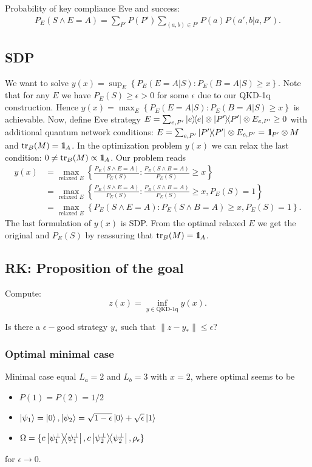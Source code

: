 \documentclass[12pt,a4paper,reqno, aps, superscriptaddress]{amsart}
\newcommand{\Id}{{\rm 1\hspace{-0.9mm}l}}
\newcommand{\proj}[1]{\ensuremath{\ketbra{#1}{#1}}}
\begin{document}
Probability of key compliance Eve and success:
\begin{equation}
\begin{split}
    P_E(S \wedge E=A) =\sum_{P'} P(P') \sum_{(a,b) \in P'} P(a) P(a',b|a,P').
\end{split}
\end{equation}

\subsection{SDP}
We want to solve $y(x) = \sup_E\left\{ P_E(E=A|S): P_E(B=A|S) \ge x\right\}$. Note that for any $E$ we have $P_E(S) \ge \epsilon > 0$ for some $\epsilon$ due to our QKD-1q construction. Hence $y(x) = \max_E\left\{ P_E(E=A|S): P_E(B=A|S) \ge x\right\}$ is achievable. Now, define Eve strategy $E = \sum_{e,P'} \proj{e} \otimes \proj{P'} \otimes E_{e,P'} \ge 0$ with additional quantum network conditions: $E = \sum_{e,P'} \proj{P'} \otimes E_{e,P'} = \Id_{P'} \otimes M$ and $\tr_{B}(M) = \Id_A$. In the optimization problem $y(x)$ we can relax the last condition: $0 \neq \tr_{B}(M) \propto \Id_A$. Our problem reads
\begin{equation}
    \begin{split}
        y(x) &= \max_{\text{relaxed }E}\left\{ \frac{P_E(S \wedge E=A)}{P_E(S)}: \frac{P_E(S \wedge B=A)}{P_E(S)} \ge x\right\}\\
        &= \max_{\text{relaxed }E}\left\{ \frac{P_E(S \wedge E=A)}{P_E(S)}: \frac{P_E(S \wedge B=A)}{P_E(S)} \ge x, P_E(S)=1\right\}\\
        &= \max_{\text{relaxed }E}\left\{ P_E(S \wedge E=A): P_E(S \wedge B=A) \ge x, P_E(S)=1\right\}.
    \end{split}
\end{equation}
The last formulation of $y(x)$ is SDP. From the optimal relaxed $E$ we get the original and $P_E(S)$ by reassuring that $\tr_{B}(M) = \Id_A$.  

\subsection{RK: Proposition of the goal}
Compute:
\begin{equation}
    z(x) = \inf_{y \in \text{QKD-1q}} y(x).
\end{equation}

Is there a $\epsilon-$good strategy $y_*$ such that $\|z-y_*\|\le \epsilon$?

\subsubsection{Optimal minimal case}
Minimal case equal $L_a=2$ and $L_b=3$ with $x=2$, where optimal seems to be
\begin{itemize}
    \item $P(1)=P(2)=1/2$
    \item $\ket{\psi_1}=\ket{0}, \ket{\psi_2}=\sqrt{1-\epsilon}\ket{0}+\sqrt{\epsilon}\ket{1}$
    \item $\Omega = \{c\proj{\psi_1^\perp}, c\proj{\psi_2^\perp}, \rho_\epsilon\}$
\end{itemize}
for $\epsilon\to0$.
\end{document}
